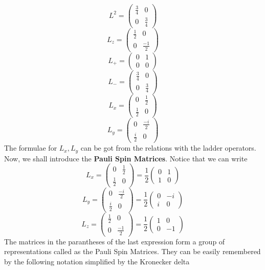 \documentclass[12pt]{article}
\begin{document}
$$
L^2 = 
\begin{pmatrix} 
  \frac{3}{4}     & 0\\ 
  0 & \frac{3}{4} 
\end{pmatrix}
$$
$$
L_z = 
\begin{pmatrix} 
  \frac{1}{2}     & 0\\ 
  0 & \frac{-1}{2} 
\end{pmatrix}
$$
$$
L_+ = 
\begin{pmatrix} 
  0     & 1\\ 
  0 & 0 
\end{pmatrix}
$$
$$
L_- = 
\begin{pmatrix} 
  \frac{3}{4}     & 0\\ 
  0 & \frac{3}{4} 
\end{pmatrix}
$$
$$
L_x = 
\begin{pmatrix} 
  0     & \frac{1}{2}\\ 
  \frac{1}{2} & 0 
\end{pmatrix}
$$
$$
L_y = 
\begin{pmatrix} 
  0    & \frac{-i}{2}\\ 
  \frac{i}{2} & 0 
\end{pmatrix}
$$
The formulae for $L_x, L_y$ can be got from the relations with the ladder operators. Now, we shall introduce the \textbf{Pauli Spin Matrices}. Notice that we can write
$$
L_x = 
\begin{pmatrix} 
  0     & \frac{1}{2}\\ 
  \frac{1}{2} & 0 
\end{pmatrix}
=\frac{1}{2}
\begin{pmatrix} 
  0     & 1\\ 
  1 & 0 
\end{pmatrix}
$$
$$
L_y = 
\begin{pmatrix} 
  0    & \frac{-i}{2}\\ 
  \frac{i}{2} & 0 
\end{pmatrix}
=\frac{1}{2}
\begin{pmatrix} 
  0     & -i\\ 
  i & 0 
\end{pmatrix}
$$
$$
L_z = 
\begin{pmatrix} 
  \frac{1}{2}     & 0\\ 
  0 & \frac{-1}{2} 
\end{pmatrix}
=\frac{1}{2}
\begin{pmatrix} 
   1  & 0\\ 
  0 & -1 
\end{pmatrix}
$$
The matrices in the parantheses of the last expression form a group of representations called as the Pauli Spin Matrices. They can be easily remembered by the following notation simplified by the Kronecker delta
\end{document}

